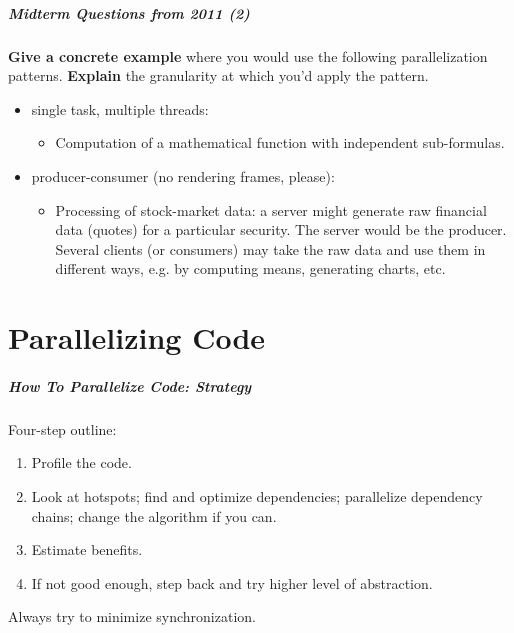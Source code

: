 \documentclass[aspectratio=43]{beamer}
\newenvironment{changemargin}[1]{%
  \begin{list}{}{%
    \setlength{\topsep}{0pt}%
    \setlength{\leftmargin}{#1}%
    \setlength{\rightmargin}{1em}
    \setlength{\listparindent}{\parindent}%
    \setlength{\itemindent}{\parindent}%
    \setlength{\parsep}{\parskip}%
  }%
  \item[]}{\end{list}}
\begin{document}
\begin{frame}
  \frametitle{Midterm Questions from 2011 (2)}

\begin{changemargin}{2.5cm}
  {\bf Give a concrete example} where you would use the following
  parallelization patterns. {\bf Explain} the granularity at which you'd apply
  the pattern.
  \begin{itemize}
    \item single task, multiple threads:
    \begin{itemize}
      \item<2-> Computation of a mathematical function with independent
        sub-formulas.
    \end{itemize}
    \item producer-consumer (no rendering frames, please):
    \begin{itemize}
      \item<2-> Processing of stock-market data:
        a server might generate raw financial data (quotes) for a
        particular security. The server would be the producer. Several clients
        (or consumers) may take the raw data and use them in different ways, e.g. by computing means, generating charts, etc.
    \end{itemize}
  \end{itemize}
 \end{changemargin}
\end{frame}

\part{Parallelizing Code}
\frame{\partpage}

\begin{frame}
  \frametitle{How To Parallelize Code: Strategy}
  
  \begin{changemargin}{2.5cm}
  Four-step outline:
  \begin{enumerate}
    \item Profile the code.
    \item Look at hotspots; find and optimize dependencies; parallelize dependency chains; change the algorithm if you can.
    \item Estimate benefits.
    \item If not good enough, step back and try higher level of abstraction.
  \end{enumerate}
  Always try to minimize synchronization.
  \end{changemargin}

\end{frame}
\end{document}
